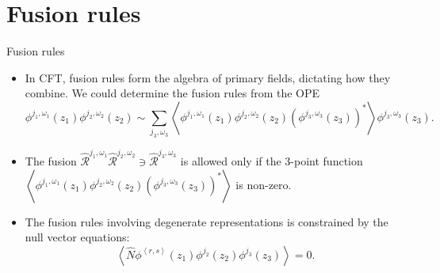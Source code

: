 \documentclass{beamer}
\newcommand{\vev}[1]{\left\langle #1 \right\rangle}
\begin{document}
\section{Fusion rules}

\begin{frame}{Fusion rules}
  \begin{itemize}
    \item In CFT, fusion rules form the algebra of primary fields, dictating how they combine. 
          We could determine the fusion rules from the OPE 
          \begin{equation}
              \phi^{j_{1},\omega_{1}}(z_{1}) \phi^{j_{2},\omega_{2}}(z_{2}) \sim \sum_{j_{3},\omega_{3}}
              \vev{\phi^{j_{1},\omega_{1}}(z_{1}) \phi^{j_{2},\omega_{2}}(z_{2}) \left(\phi^{j_{3},\omega_{3}}(z_{3}) \right)^{*}} \phi^{j_{3},\omega_{3}}(z_{3}).
          \end{equation}
    \item The fusion $\widehat{\mathcal{R}}^{j_{1},\omega_{1}} \widehat{\mathcal{R}}^{j_{2},\omega_{2}} \ni \widehat{\mathcal{R}}^{j_{3},\omega_{3}}$
          is allowed only if the 3-point function 
          $\vev{\phi^{j_{1},\omega_{1}}(z_{1}) \phi^{j_{2},\omega_{2}}(z_{2}) \left(\phi^{j_{3},\omega_{3}}(z_{3}) \right)^{*}}$ 
          is non-zero.
    \item The fusion rules involving degenerate representations is constrained by the null vector equations:
          \begin{equation}
            \vev{\hat{N} \phi^{\vev{r,s}}(z_{1}) \phi^{j_{2}}(z_{2}) \phi^{j_{3}}(z_{3})} = 0. 
          \end{equation}
  \end{itemize}
\end{frame}
\end{document}

